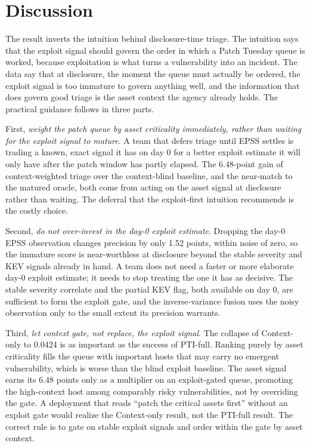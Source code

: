 \documentclass[journal]{IEEEtran}
\begin{document}
\section{Discussion}
The result inverts the intuition behind disclosure-time triage. The intuition says that the exploit
signal should govern the order in which a Patch Tuesday queue is worked, because exploitation is
what turns a vulnerability into an incident. The data say that at disclosure, the moment the queue
must actually be ordered, the exploit signal is too immature to govern anything well, and the
information that does govern good triage is the asset context the agency already holds. The practical
guidance follows in three parts.

First, \emph{weight the patch queue by asset criticality immediately, rather than waiting for the
exploit signal to mature}. A team that defers triage until EPSS settles is trading a known, exact
signal it has on day 0 for a better exploit estimate it will only have after the patch window has
partly elapsed. The 6.48-point gain of context-weighted triage over the context-blind baseline, and
the near-match to the matured oracle, both come from acting on the asset signal at disclosure rather
than waiting. The deferral that the exploit-first intuition recommends is the costly choice.

Second, \emph{do not over-invest in the day-0 exploit estimate}. Dropping the day-0 EPSS observation
changes precision by only 1.52 points, within noise of zero, so the immature score is near-worthless
at disclosure beyond the stable severity and KEV signals already in hand. A team does not need a
faster or more elaborate day-0 exploit estimate; it needs to stop treating the one it has as decisive.
The stable severity correlate and the partial KEV flag, both available on day 0, are sufficient to
form the exploit gate, and the inverse-variance fusion uses the noisy observation only to the small
extent its precision warrants.

Third, \emph{let context gate, not replace, the exploit signal}. The collapse of Context-only to
0.0424 is as important as the success of PTI-full. Ranking purely by asset criticality fills the
queue with important hosts that may carry no emergent vulnerability, which is worse than the blind
exploit baseline. The asset signal earns its 6.48 points only as a multiplier on an exploit-gated
queue, promoting the high-context host among comparably risky vulnerabilities, not by overriding the
gate. A deployment that reads ``patch the critical assets first'' without an exploit gate would
realize the Context-only result, not the PTI-full result. The correct rule is to gate on stable
exploit signals and order within the gate by asset context.
\end{document}
